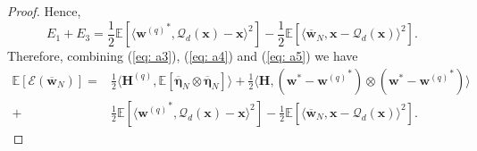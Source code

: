 \documentclass[11pt, letterpaper]{article}
\begin{document}
\begin{proof}
    Hence,
    \begin{equation}
        \label{eq: a5}
        E_1+E_3=\frac{1}{2}\mathbb{E}\left[\langle {\mathbf{w}^{(q)}}^*,\mathcal{Q}_d(\mathbf{x})-\mathbf{x}\rangle^2\right]-\frac{1}{2}\mathbb{E}\left[\langle \overline{\mathbf{w}}_N ,\mathbf{x}-\mathcal{Q}_d(\mathbf{x}) \rangle^2\right].
    \end{equation}
    Therefore, combining (\ref{eq: a3}), (\ref{eq: a4}) and (\ref{eq: a5}) we have
    \begin{equation*}
        \begin{aligned}
            \mathbb{E}[\mathcal{E}(\overline{\mathbf{w}}_N)]=&\frac{1}{2}\langle\mathbf{H}^{(q)},\mathbb{E}[\overline{\boldsymbol{\eta}}_N\otimes\overline{\boldsymbol{\eta}}_N]\rangle
            +\frac{1}{2}\langle\mathbf{H},({\mathbf{w}}^*-{\mathbf{w}^{(q)}}^*)\otimes({\mathbf{w}}^*-{\mathbf{w}^{(q)}}^*)\rangle\\
            +&\frac{1}{2}\mathbb{E}\left[\langle {\mathbf{w}^{(q)}}^*,\mathcal{Q}_d(\mathbf{x})-\mathbf{x}\rangle^2\right]-\frac{1}{2}\mathbb{E}\left[\langle \overline{\mathbf{w}}_N ,\mathbf{x}-\mathcal{Q}_d(\mathbf{x}) \rangle^2\right].
        \end{aligned}
    \end{equation*}
\end{proof}
\end{document}
